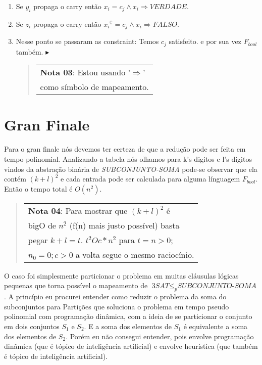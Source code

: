 \documentclass[12pt, a4paper]{article}
\begin{document}
\begin{enumerate}
\item Se $y_i$ propaga o carry então $x_i = c_j  \wedge x_i \Rightarrow \textit{VERDADE}$.

\item Se $z_i$ propaga o carry então ${x_i}^\complement = c_j \wedge x_i \Rightarrow \textit{FALSO}$.

\item Nesse ponto se passaram as constraint: Temos $c_j$ satisfeito. e por sua vez $F_{bool}$ também. $\blacktriangleright$

\begin{quote}
  \flushright
    \begin{tabular}{|l}
\textbf{Nota 03}: Estou usando '$\Rightarrow$' \\ como símbolo de mapeamento.
  \end{tabular}
\end{quote}

\end{enumerate}

\section{Gran Finale}

Para o gran finale nós devemos ter certeza de que a redução pode ser feita em tempo polinomial. Analizando a tabela nós olhamos para k's digitos e l's digitos vindos da abstração binária de \textit{SUBCONJUNTO-SOMA} pode-se observar que ela contém ${(k + l)}^2$ e cada entrada pode ser calculada para alguma línguagem $F_{bool}$. Então o tempo total é $O(n^2)$. \cite{sipser06}

\begin{quote}
  \flushright
    \begin{tabular}{|l}
\textbf{Nota 04}: Para mostrar que ${(k + l)}^2$ é\\ bigO de $n^2$ (f(n) mais justo possível) basta\\ pegar $ k + l = t $. $t^2 Oc*{n}^2$ para $t=n>0;$\\ $n_0=0; c>0$ a volta segue o mesmo raciocínio.
  \end{tabular}
\end{quote}

O caso foi simplesmente particionar o problema em muitas cláusulas lógicas pequenas que torna possível o mapeamento de $\textit{3SAT} \leqslant_{p} \textit{SUBCONJUNTO-SOMA}$. A princípio eu procurei entender como reduzir o problema da soma do subconjuntos para Partições que soluciona o problema em tempo pseudo polinomial com programação dinâmica, com a ideia de se particionar o conjunto em dois conjuntos $S_1$ e $S_2$. E a soma dos elementos de $S_1$ é equivalente a soma dos elementos de $S_2$. Porém eu não consegui entender, pois envolve programação dinâmica (que é tópico de inteligência artificial) e envolve heurística (que também é tópico de inteligência artificial).
\end{document}
